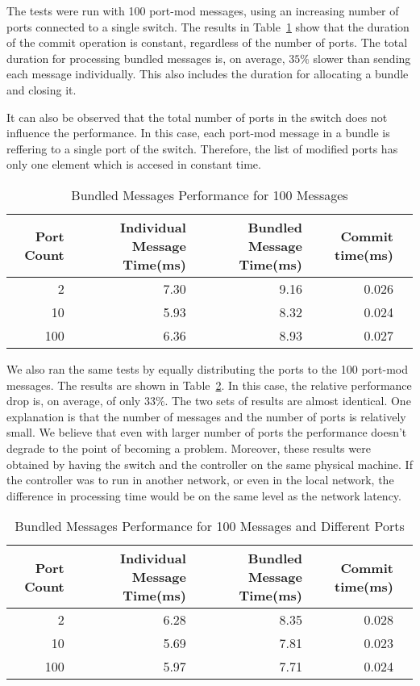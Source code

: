 The tests were run with 100 port-mod messages, using an increasing number of ports connected to a single
switch. The results in Table~\ref{tbl:bundleperf} show that the duration of the commit operation is constant,
regardless of the number of ports. The total duration for processing bundled messages is, on average,
$35\%$ slower than sending each message individually. This also includes the duration for allocating
a bundle and closing it.

It can also be observed that the total number of ports in the switch does not influence the performance.
In this case, each port-mod message in a bundle is reffering to a single port of the switch. Therefore, the
list of modified ports has only one element which is accesed in constant time.

\begin{table}[h]
  \centering
  \begin{tabular}{rrrrr}
    \toprule
      Port Count & Individual Message Time(ms) & Bundled Message Time(ms) & Commit time(ms) \\
    \midrule
        2 & 7.30 & 9.16 & 0.026 \\
       10 & 5.93 & 8.32 & 0.024 \\
       100 & 6.36 & 8.93 & 0.027 \\
    \bottomrule
  \end{tabular}
  \caption{Bundled Messages Performance for 100 Messages}
    \label{tbl:bundleperf}
\end{table}

We also ran the same tests by equally distributing the ports to the 100 port-mod messages. The results
are shown in Table~\ref{tbl:bundleperf2}. In this case, the relative performance drop is, on average, of only $33\%$.
The two sets of results are almost identical. One explanation is that the number of messages and the number of
ports is relatively small. We believe that even with larger number of ports the performance doesn't degrade
to the point of becoming a problem. Moreover, these results were obtained by having the switch and the controller
on the same physical machine. If the controller was to run in another network, or even in the local network,
the difference in processing time would be on the same level as the network latency.

\begin{table}[h]
  \centering
  \begin{tabular}{rrrrr}
    \toprule
      Port Count & Individual Message Time(ms) & Bundled Message Time(ms) & Commit time(ms) \\
    \midrule
        2 & 6.28 & 8.35 & 0.028 \\
       10 & 5.69 & 7.81 & 0.023 \\
       100 & 5.97 & 7.71 & 0.024 \\
    \bottomrule
  \end{tabular}
  \caption{Bundled Messages Performance for 100 Messages and Different Ports}
    \label{tbl:bundleperf2}
\end{table}

